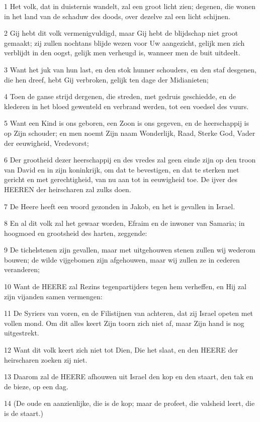 \par 1 Het volk, dat in duisternis wandelt, zal een groot licht zien; degenen, die wonen in het land van de schaduw des doods, over dezelve zal een licht schijnen.
\par 2 Gij hebt dit volk vermenigvuldigd, maar Gij hebt de blijdschap niet groot gemaakt; zij zullen nochtans blijde wezen voor Uw aangezicht, gelijk men zich verblijdt in den oogst, gelijk men verheugd is, wanneer men de buit uitdeelt.
\par 3 Want het juk van hun last, en den stok hunner schouders, en den staf desgenen, die hen dreef, hebt Gij verbroken, gelijk ten dage der Midianieten;
\par 4 Toen de ganse strijd dergenen, die streden, met gedruis geschiedde, en de klederen in het bloed gewenteld en verbrand werden, tot een voedsel des vuurs.
\par 5 Want een Kind is ons geboren, een Zoon is ons gegeven, en de heerschappij is op Zijn schouder; en men noemt Zijn naam Wonderlijk, Raad, Sterke God, Vader der eeuwigheid, Vredevorst;
\par 6 Der grootheid dezer heerschappij en des vredes zal geen einde zijn op den troon van David en in zijn koninkrijk, om dat te bevestigen, en dat te sterken met gericht en met gerechtigheid, van nu aan tot in eeuwigheid toe. De ijver des HEEREN der heirscharen zal zulks doen.
\par 7 De Heere heeft een woord gezonden in Jakob, en het is gevallen in Israel.
\par 8 En al dit volk zal het gewaar worden, Efraim en de inwoner van Samaria; in hoogmoed en grootsheid des harten, zeggende:
\par 9 De tichelstenen zijn gevallen, maar met uitgehouwen stenen zullen wij wederom bouwen; de wilde vijgebomen zijn afgehouwen, maar wij zullen ze in cederen veranderen;
\par 10 Want de HEERE zal Rezins tegenpartijders tegen hem verheffen, en Hij zal zijn vijanden samen vermengen:
\par 11 De Syriers van voren, en de Filistijnen van achteren, dat zij Israel opeten met vollen mond. Om dit alles keert Zijn toorn zich niet af, maar Zijn hand is nog uitgestrekt.
\par 12 Want dit volk keert zich niet tot Dien, Die het slaat, en den HEERE der heirscharen zoeken zij niet.
\par 13 Daarom zal de HEERE afhouwen uit Israel den kop en den staart, den tak en de bieze, op een dag.
\par 14 (De oude en aanzienlijke, die is de kop; maar de profeet, die valsheid leert, die is de staart.)

